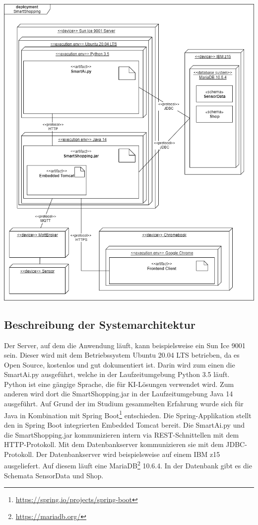 \documentclass[runningheads]{llncs}
\begin{document}
\includegraphics[width=\linewidth]{images/deployment_diagram}


\subsection{Beschreibung der Systemarchitektur}


Der Server, auf dem die Anwendung läuft, kann beispielsweise ein Sun Ice 9001 sein.
Dieser wird mit dem Betriebssystem Ubuntu 20.04 LTS betrieben, da es Open Source, kostenlos und gut dokumentiert ist.
Darin wird zum einen die SmartAi.py ausgeführt, welche in der Laufzeitumgebung Python 3.5 läuft. 
Python ist eine gängige Sprache, die für KI-Lösungen verwendet wird.
Zum anderen wird dort die SmartShopping.jar in der Laufzeitumgebung Java 14 ausgeführt.
Auf Grund der im Studium gesammelten Erfahrung wurde sich für Java in Kombination mit Spring Boot\footnote{\url{https://spring.io/projects/spring-boot}} entschieden.
Die Spring-Applikation stellt den in Spring Boot integrierten Embedded Tomcat bereit.
Die SmartAi.py und die SmartShopping.jar kommunizieren intern via REST-Schnittellen mit dem HTTP-Protokoll.
Mit dem Datenbankserver kommunizieren sie mit dem JDBC-Protokoll.
Der Datenbankserver wird beispielsweise auf einem IBM z15 ausgeliefert.
Auf diesem läuft eine MariaDB\footnote{\url{https://mariadb.org/}} 10.6.4.
In der Datenbank gibt es die Schemata SensorData und Shop.
\end{document}
